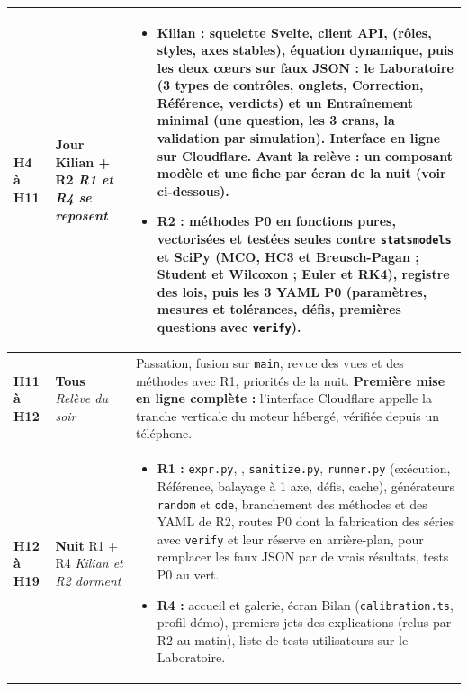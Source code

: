 \documentclass[11pt,a4paper]{article}
\begin{document}
\begin{longtable}{@{}L{1.9cm} L{2.4cm} >{\raggedright\arraybackslash}p{\dimexpr\textwidth-4.3cm-4\tabcolsep\relax}@{}}
  \textbf{H4 à H11}  &
  \textbf{Jour} \newline Kilian + R2 \newline \emph{R1 et R4 se reposent} &
  \begin{itemize}[leftmargin=*, nosep]
    \item \textbf{Kilian :} squelette Svelte, client API,  (rôles, styles, axes stables), équation dynamique, puis les deux c\oe urs sur faux JSON : le \textbf{Laboratoire} (3 types de contrôles, onglets, Correction, Référence, verdicts) et un \textbf{Entraînement minimal} (une question, les 3 crans, la validation par simulation). Interface en ligne sur Cloudflare. \textbf{Avant la relève :} un composant modèle et une fiche par écran de la nuit (voir ci-dessous).
    \item \textbf{R2 :} méthodes P0 en fonctions pures, vectorisées et testées seules contre \texttt{statsmodels} et SciPy (MCO, HC3 et Breusch-Pagan ; Student et Wilcoxon ; Euler et RK4), registre des lois, puis les 3 YAML P0 (paramètres, mesures et tolérances, défis, premières questions avec \texttt{verify}).
  \end{itemize} \\
  \midrule

  \textbf{H11 à H12}  &
  \textbf{Tous} \newline \emph{Relève du soir} &
  Passation, fusion sur \texttt{main}, revue des vues et des méthodes avec R1, priorités de la nuit. \textbf{Première mise en ligne complète :} l'interface Cloudflare appelle la tranche verticale du moteur hébergé, vérifiée depuis un téléphone. \\
  \midrule

  \textbf{H12 à H19}  &
  \textbf{Nuit} \newline R1 + R4 \newline \emph{Kilian et R2 dorment} &
  \begin{itemize}[leftmargin=*, nosep]
    \item \textbf{R1 :} \texttt{expr.py}, , \texttt{sanitize.py}, \texttt{runner.py} (exécution, Référence, balayage à 1 axe, défis, cache), générateurs \texttt{random} et \texttt{ode}, branchement des méthodes et des YAML de R2, routes P0 dont la fabrication des séries avec \texttt{verify} et leur réserve en arrière-plan,  pour remplacer les faux JSON par de vrais résultats, tests P0 au vert.
    \item \textbf{R4 :} accueil et galerie, écran Bilan (\texttt{calibration.ts}, profil démo), premiers jets des explications (relus par R2 au matin), liste de tests utilisateurs sur le Laboratoire.
  \end{itemize} \\
  \midrule


\end{longtable}
\end{document}
